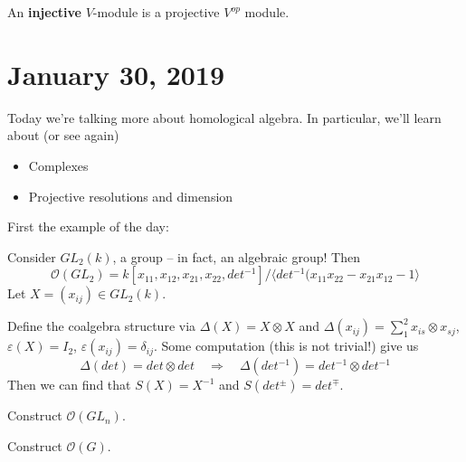 \documentclass[12pt]{article}
\begin{document}
\begin{defn}
	An \textbf{injective} $V$-module is a projective $V^{op}$ module.
\end{defn}

\section{January 30, 2019}
Today we're talking more about homological algebra. In particular, we'll learn about (or see again)
\begin{itemize}
	\item Complexes
	\item Projective resolutions and dimension
\end{itemize}
First the example of the day:
\begin{ex}
	Consider $GL_2(k)$, a group -- in fact, an algebraic group! Then 
	\[\mathcal{O}(GL_2)=k[x_{11},x_{12},x_{21},x_{22},det^{-1}]/\langle det^{-1}(x_{11}x_{22}-x_{21}x_{12}-1\rangle\]
	Let $X=(x_{ij})\in GL_2(k)$.

	Define the coalgebra structure via $\Delta(X)=X\otimes X$ and $\Delta(x_{ij})=\sum_1^2 x_{is}\otimes x_{sj}$,
	$\varepsilon(X)=I_2$, $\varepsilon(x_{ij})=\delta_{ij}$. Some computation (this is not trivial!) give us
	\[\Delta(det)=det\otimes det\quad\Rightarrow\quad \Delta(det^{-1})=det^{-1}\otimes det^{-1}\]
	Then we can find that $S(X)=X^{-1}$ and $S(det^{\pm})=det^{\mp}$.
\end{ex}
\begin{prob}
	Construct $\mathcal{O}(GL_n)$.
\end{prob}
\begin{prob}
	Construct $\mathcal{O}(G)$.
\end{prob}
\end{document}
